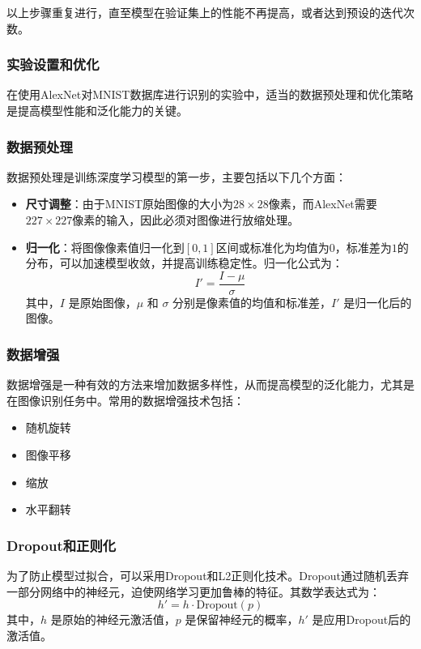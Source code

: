 \documentclass[a4paper,12pt]{article}
\begin{document}
以上步骤重复进行，直至模型在验证集上的性能不再提高，或者达到预设的迭代次数。


\subsubsection{实验设置和优化}
在使用AlexNet对MNIST数据库进行识别的实验中，适当的数据预处理和优化策略是提高模型性能和泛化能力的关键。

\subsubsection*{数据预处理}
数据预处理是训练深度学习模型的第一步，主要包括以下几个方面：
\begin{itemize}
	\item \textbf{尺寸调整}：由于MNIST原始图像的大小为$28 \times 28$像素，而AlexNet需要$227 \times 227$像素的输入，因此必须对图像进行放缩处理。
	\item \textbf{归一化}：将图像像素值归一化到$[0, 1]$区间或标准化为均值为$0$，标准差为$1$的分布，可以加速模型收敛，并提高训练稳定性。归一化公式为：
	\begin{equation}
		I' = \frac{I - \mu}{\sigma}
	\end{equation}
	其中，$I$ 是原始图像，$\mu$ 和 $\sigma$ 分别是像素值的均值和标准差，$I'$ 是归一化后的图像。
\end{itemize}

\subsubsection*{数据增强}
数据增强是一种有效的方法来增加数据多样性，从而提高模型的泛化能力，尤其是在图像识别任务中。常用的数据增强技术包括：
\begin{itemize}
	\item 随机旋转
	\item 图像平移
	\item 缩放
	\item 水平翻转
\end{itemize}

\subsubsection*{Dropout和正则化}
为了防止模型过拟合，可以采用Dropout和L2正则化技术。Dropout通过随机丢弃一部分网络中的神经元，迫使网络学习更加鲁棒的特征。其数学表达式为：
\begin{equation}
	h' = h \cdot \text{Dropout}(p)
\end{equation}
其中，$h$ 是原始的神经元激活值，$p$ 是保留神经元的概率，$h'$ 是应用Dropout后的激活值。
\end{document}
